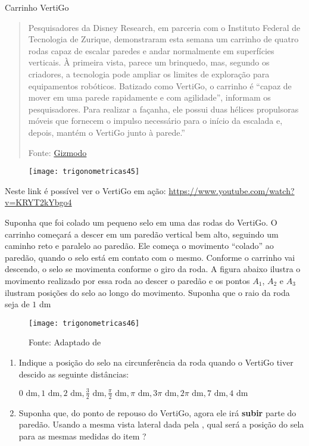 \begin{task}{Carrinho VertiGo}
\label{trig-ativ10}

\begin{quote}

Pesquisadores da Disney Research, em parceria com o Instituto Federal de Tecnologia de Zurique, demonstraram esta semana um carrinho de quatro rodas capaz de escalar paredes e andar normalmente em superfícies verticais.
À primeira vista, parece um brinquedo, mas, segundo os criadores, a tecnologia pode ampliar os limites de exploração para equipamentos robóticos. Batizado como VertiGo, o carrinho é “capaz de mover em uma parede rapidamente e com agilidade”, informam os pesquisadores. Para realizar a façanha, ele possui duas hélices propulsoras móveis que fornecem o impulso necessário para o início da escalada e, depois, mantém o VertiGo junto à parede.”

\flushright
Fonte: \href{https://gizmodo.uol.com.br/o-novo-robo-da-disney-escala-paredes-como-uma-lagartixa/}{Gizmodo}
\end{quote}


\begin{figure}[H]
\centering

\texttt{[image: trigonometricas45]}
\end{figure}

Neste link é possível ver o VertiGo em ação: \url{https://www.youtube.com/watch?v=KRYT2kYbgo4}


Suponha que foi colado um pequeno selo em uma das rodas do VertiGo. O carrinho começará a descer em um paredão vertical bem alto, seguindo um caminho reto e paralelo ao paredão. Ele começa o movimento “colado”{} ao paredão, quando o selo está em contato com o mesmo. Conforme o carrinho vai descendo, o selo se movimenta conforme o giro da roda. A figura abaixo ilustra o movimento realizado por essa roda ao descer o paredão e os pontos $A_1$, $A_2$ e $A_3$ ilustram posições do selo ao longo do movimento. Suponha que o raio da roda seja de $1$ dm

\begin{figure}[H]
\centering

\texttt{[image: trigonometricas46]}
\caption{Fonte: Adaptado de \cite{ekici2010}}
\label{trigonometrica46}
\end{figure}

\begin{enumerate}
\item Indique a posição do selo na circunferência da roda quando o VertiGo tiver descido as seguinte distâncias:

$0\text{ dm}, 1\text{ dm}, 2\text{ dm}, \frac{3}{2}\text{ dm}, \frac{\pi}{2}\text{ dm}, \pi\text{ dm}, 3\pi\text{ dm}, 2\pi\text{ dm}, 7\text{ dm}, 4\text{ dm}$
\item Suponha que, do ponto de repouso do VertiGo, agora ele irá \textbf{subir} parte do paredão. Usando a mesma vista lateral dada pela , qual será a posição do sela para as mesmas medidas do item ?
\end{enumerate}


\end{task}

